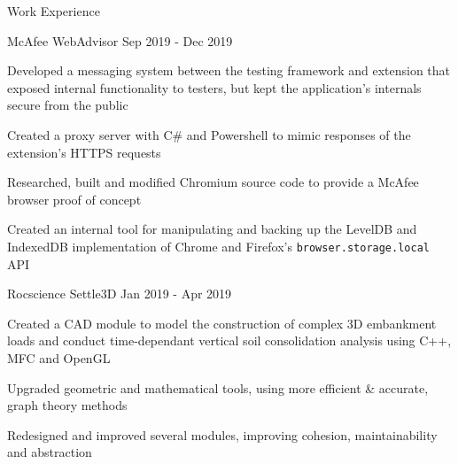 \documentclass{resume} %
\begin{document}
\begin{rSection}{Work Experience}
    \begin{workexperience}
        {McAfee}
        {WebAdvisor}
        {Sep 2019 - Dec 2019}
        {
            \item Developed a messaging system between the testing framework and extension that exposed internal functionality to testers, but kept the application's internals secure from the public
            \item Created a proxy server with C\# and Powershell to mimic responses of the extension's HTTPS requests  
            \item Researched, built and modified Chromium source code to provide a McAfee browser proof of concept 
            \item Created an internal tool for manipulating and backing up the LevelDB and IndexedDB implementation of Chrome and Firefox's \texttt{browser.storage.local} API
        }
    \end{workexperience}

    \begin{workexperience}
        {Rocscience}
        {Settle3D}
        {Jan 2019 - Apr 2019}
        {
            \item Created a CAD module to model the construction of complex 3D embankment loads and 
            conduct time-dependant vertical soil consolidation analysis using C++, MFC and OpenGL
            \item Upgraded geometric and mathematical tools, using more efficient \& accurate, graph theory methods
            \item Redesigned and improved several modules, improving cohesion, maintainability and abstraction
        }
    \end{workexperience}

    \vspace{1em}

\end{rSection}




    
\end{document}
